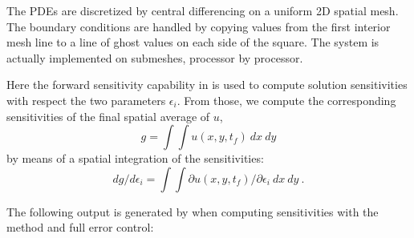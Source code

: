 The PDEs are discretized by central differencing on a uniform 2D spatial mesh.
The boundary conditions are handled by copying values from the first interior
mesh line to a line of ghost values on each side of the square.
The system is actually implemented on submeshes, processor by processor.

Here the forward sensitivity capability in {\idas} is used to compute
solution sensitivities with respect the two parameters $\epsilon_i$.
From those, we compute the corresponding sensitivities of the final spatial
average of $u$,
\begin{equation*}
  g = \int \int u(x,y,t_f) ~dx~dy
\end{equation*}
by means of a spatial integration of the sensitivities:
\begin{equation*}
  dg/d\epsilon_i = \int \int \partial u(x,y,t_f) / \partial \epsilon_i~dx~dy ~.
\end{equation*}


The following output is generated by  when computing
sensitivities with the  method and full error control:


